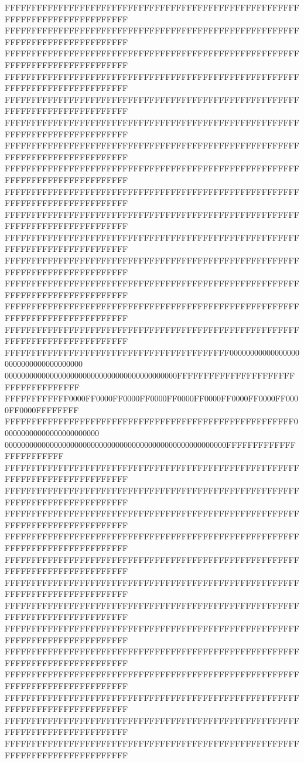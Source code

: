 FFFFFFFFFFFFFFFFFFFFFFFFFFFFFFFFFFFFFFFFFFFFFFFFFFFFFFFFFFFFFFFFFFFFFFFFFFFFFF
FFFFFFFFFFFFFFFFFFFFFFFFFFFFFFFFFFFFFFFFFFFFFFFFFFFFFFFFFFFFFFFFFFFFFFFFFFFFFF
FFFFFFFFFFFFFFFFFFFFFFFFFFFFFFFFFFFFFFFFFFFFFFFFFFFFFFFFFFFFFFFFFFFFFFFFFFFFFF
FFFFFFFFFFFFFFFFFFFFFFFFFFFFFFFFFFFFFFFFFFFFFFFFFFFFFFFFFFFFFFFFFFFFFFFFFFFFFF
FFFFFFFFFFFFFFFFFFFFFFFFFFFFFFFFFFFFFFFFFFFFFFFFFFFFFFFFFFFFFFFFFFFFFFFFFFFFFF
FFFFFFFFFFFFFFFFFFFFFFFFFFFFFFFFFFFFFFFFFFFFFFFFFFFFFFFFFFFFFFFFFFFFFFFFFFFFFF
FFFFFFFFFFFFFFFFFFFFFFFFFFFFFFFFFFFFFFFFFFFFFFFFFFFFFFFFFFFFFFFFFFFFFFFFFFFFFF
FFFFFFFFFFFFFFFFFFFFFFFFFFFFFFFFFFFFFFFFFFFFFFFFFFFFFFFFFFFFFFFFFFFFFFFFFFFFFF
FFFFFFFFFFFFFFFFFFFFFFFFFFFFFFFFFFFFFFFFFFFFFFFFFFFFFFFFFFFFFFFFFFFFFFFFFFFFFF
FFFFFFFFFFFFFFFFFFFFFFFFFFFFFFFFFFFFFFFFFFFFFFFFFFFFFFFFFFFFFFFFFFFFFFFFFFFFFF
FFFFFFFFFFFFFFFFFFFFFFFFFFFFFFFFFFFFFFFFFFFFFFFFFFFFFFFFFFFFFFFFFFFFFFFFFFFFFF
FFFFFFFFFFFFFFFFFFFFFFFFFFFFFFFFFFFFFFFFFFFFFFFFFFFFFFFFFFFFFFFFFFFFFFFFFFFFFF
FFFFFFFFFFFFFFFFFFFFFFFFFFFFFFFFFFFFFFFFFFFFFFFFFFFFFFFFFFFFFFFFFFFFFFFFFFFFFF
FFFFFFFFFFFFFFFFFFFFFFFFFFFFFFFFFFFFFFFFFFFFFFFFFFFFFFFFFFFFFFFFFFFFFFFFFFFFFF
FFFFFFFFFFFFFFFFFFFFFFFFFFFFFFFFFFFFFFFFFFFFFFFFFFFFFFFFFFFFFFFFFFFFFFFFFFFFFF
FFFFFFFFFFFFFFFFFFFFFFFFFFFFFFFFFFFFFFFFFF000000000000000000000000000000000000
000000000000000000000000000000000000000000FFFFFFFFFFFFFFFFFFFFFFFFFFFFFFFFFFFF
FFFFFFFFFFFF0000FF0000FF0000FF0000FF0000FF0000FF0000FF0000FF0000FF0000FFFFFFFF
FFFFFFFFFFFFFFFFFFFFFFFFFFFFFFFFFFFFFFFFFFFFFFFFFFFFFF000000000000000000000000
000000000000000000000000000000000000000000000000000000FFFFFFFFFFFFFFFFFFFFFFFF
FFFFFFFFFFFFFFFFFFFFFFFFFFFFFFFFFFFFFFFFFFFFFFFFFFFFFFFFFFFFFFFFFFFFFFFFFFFFFF
FFFFFFFFFFFFFFFFFFFFFFFFFFFFFFFFFFFFFFFFFFFFFFFFFFFFFFFFFFFFFFFFFFFFFFFFFFFFFF
FFFFFFFFFFFFFFFFFFFFFFFFFFFFFFFFFFFFFFFFFFFFFFFFFFFFFFFFFFFFFFFFFFFFFFFFFFFFFF
FFFFFFFFFFFFFFFFFFFFFFFFFFFFFFFFFFFFFFFFFFFFFFFFFFFFFFFFFFFFFFFFFFFFFFFFFFFFFF
FFFFFFFFFFFFFFFFFFFFFFFFFFFFFFFFFFFFFFFFFFFFFFFFFFFFFFFFFFFFFFFFFFFFFFFFFFFFFF
FFFFFFFFFFFFFFFFFFFFFFFFFFFFFFFFFFFFFFFFFFFFFFFFFFFFFFFFFFFFFFFFFFFFFFFFFFFFFF
FFFFFFFFFFFFFFFFFFFFFFFFFFFFFFFFFFFFFFFFFFFFFFFFFFFFFFFFFFFFFFFFFFFFFFFFFFFFFF
FFFFFFFFFFFFFFFFFFFFFFFFFFFFFFFFFFFFFFFFFFFFFFFFFFFFFFFFFFFFFFFFFFFFFFFFFFFFFF
FFFFFFFFFFFFFFFFFFFFFFFFFFFFFFFFFFFFFFFFFFFFFFFFFFFFFFFFFFFFFFFFFFFFFFFFFFFFFF
FFFFFFFFFFFFFFFFFFFFFFFFFFFFFFFFFFFFFFFFFFFFFFFFFFFFFFFFFFFFFFFFFFFFFFFFFFFFFF
FFFFFFFFFFFFFFFFFFFFFFFFFFFFFFFFFFFFFFFFFFFFFFFFFFFFFFFFFFFFFFFFFFFFFFFFFFFFFF
FFFFFFFFFFFFFFFFFFFFFFFFFFFFFFFFFFFFFFFFFFFFFFFFFFFFFFFFFFFFFFFFFFFFFFFFFFFFFF
FFFFFFFFFFFFFFFFFFFFFFFFFFFFFFFFFFFFFFFFFFFFFFFFFFFFFFFFFFFFFFFFFFFFFFFFFFFFFF
